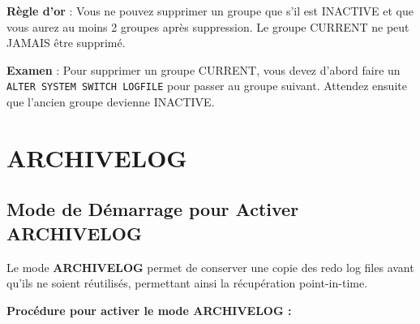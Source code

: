 \documentclass[11pt,a4paper]{article}
\begin{document}
\begin{importantbox}
\textbf{Règle d'or} : Vous ne pouvez supprimer un groupe que s'il est INACTIVE et que vous aurez au moins 2 groupes après suppression. Le groupe CURRENT ne peut JAMAIS être supprimé.
\end{importantbox}

\begin{tipbox}
\textbf{Examen} : Pour supprimer un groupe CURRENT, vous devez d'abord faire un \texttt{ALTER SYSTEM SWITCH LOGFILE} pour passer au groupe suivant. Attendez ensuite que l'ancien groupe devienne INACTIVE.
\end{tipbox}

\section{ARCHIVELOG}

\subsection{Mode de Démarrage pour Activer ARCHIVELOG}

\begin{definitionbox}
Le mode \textbf{ARCHIVELOG} permet de conserver une copie des redo log files avant qu'ils ne soient réutilisés, permettant ainsi la récupération point-in-time.
\end{definitionbox}

\textbf{Procédure pour activer le mode ARCHIVELOG :}
\end{document}
